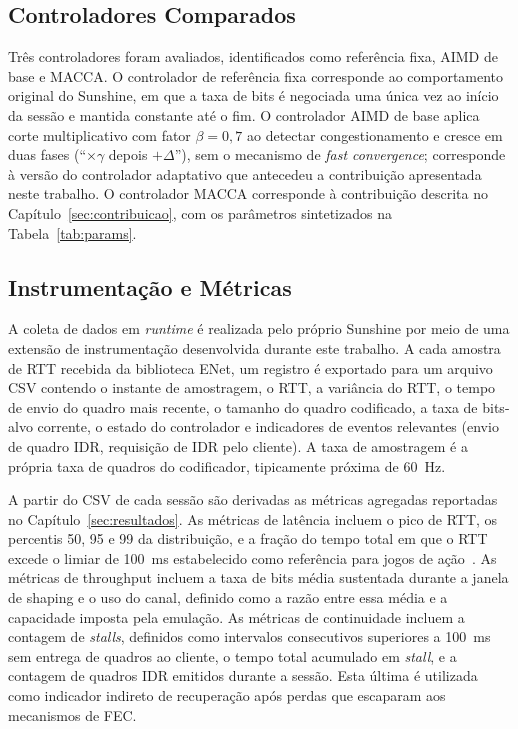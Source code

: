 \documentclass[conference]{IEEEtran}
\begin{document}
\subsection{Controladores Comparados}

Três controladores foram avaliados, identificados como
referência fixa, AIMD de base e MACCA. O controlador de
referência fixa corresponde ao comportamento original do
Sunshine, em que a taxa de bits é negociada uma única vez ao
início da sessão e mantida constante até o fim. O controlador
AIMD de base aplica corte multiplicativo com fator $\beta = 0{,}7$
ao detectar congestionamento e cresce em duas fases
(``$\times \gamma$ depois $+\Delta$''), sem o mecanismo de
\emph{fast convergence}; corresponde à versão do controlador
adaptativo que antecedeu a contribuição apresentada neste
trabalho. O controlador MACCA corresponde à contribuição
descrita no Capítulo~\ref{sec:contribuicao}, com os parâmetros
sintetizados na Tabela~\ref{tab:params}.

\subsection{Instrumentação e Métricas}

A coleta de dados em \emph{runtime} é realizada pelo próprio
Sunshine por meio de uma extensão de instrumentação
desenvolvida durante este trabalho. A cada amostra de RTT recebida
da biblioteca ENet, um registro é exportado para um arquivo
CSV contendo o instante de amostragem, o RTT, a variância do
RTT, o tempo de envio do quadro mais recente, o tamanho do
quadro codificado, a taxa de bits-alvo corrente, o estado do
controlador e indicadores de eventos relevantes (envio de
quadro IDR, requisição de IDR pelo cliente). A taxa de
amostragem é a própria taxa de quadros do codificador,
tipicamente próxima de \SI{60}{\hertz}.

A partir do CSV de cada sessão são derivadas as métricas
agregadas reportadas no Capítulo~\ref{sec:resultados}. As
métricas de latência incluem o pico de RTT, os percentis 50,
95 e 99 da distribuição, e a fração do tempo total em que o
RTT excede o limiar de \SI{100}{\milli\second} estabelecido
como referência para jogos de ação~\cite{baldovino2022}. As
métricas de throughput incluem a taxa de bits média sustentada
durante a janela de shaping e o uso do canal, definido como a
razão entre essa média e a capacidade imposta pela emulação.
As métricas de continuidade incluem a contagem de \emph{stalls},
definidos como intervalos consecutivos superiores a
\SI{100}{\milli\second} sem entrega de quadros ao cliente, o
tempo total acumulado em \emph{stall}, e a contagem de quadros
IDR emitidos durante a sessão. Esta última é utilizada como
indicador indireto de recuperação após perdas que escaparam aos
mecanismos de FEC.
\end{document}
